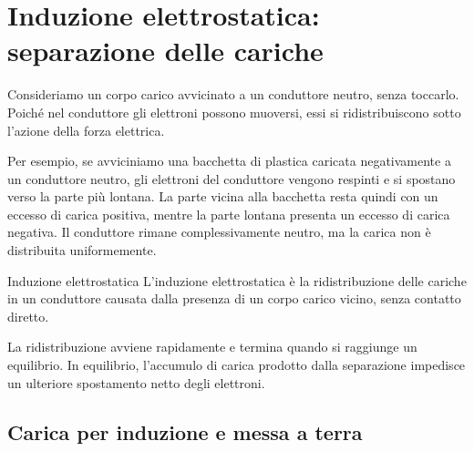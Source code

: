 \documentclass[a4paper]{article}
\begin{document}
\section{Induzione elettrostatica: separazione delle cariche}

Consideriamo un corpo carico avvicinato a un conduttore neutro, senza toccarlo. Poiché nel conduttore gli elettroni possono muoversi, essi si ridistribuiscono sotto l'azione della forza elettrica.

Per esempio, se avviciniamo una bacchetta di plastica caricata negativamente a un conduttore neutro, gli elettroni del conduttore vengono respinti e si spostano verso la parte più lontana. La parte vicina alla bacchetta resta quindi con un eccesso di carica positiva, mentre la parte lontana presenta un eccesso di carica negativa. Il conduttore rimane complessivamente neutro, ma la carica non è distribuita uniformemente.

\begin{snippetdefinition}{Induzione elettrostatica}
    L'induzione elettrostatica è la ridistribuzione delle cariche in un conduttore causata dalla presenza di un corpo carico vicino, senza contatto diretto.
\end{snippetdefinition}

\begin{center}
\end{center}

La ridistribuzione avviene rapidamente e termina quando si raggiunge un equilibrio. In equilibrio, l'accumulo di carica prodotto dalla separazione impedisce un ulteriore spostamento netto degli elettroni.

\subsection{Carica per induzione e messa a terra}
\end{document}
